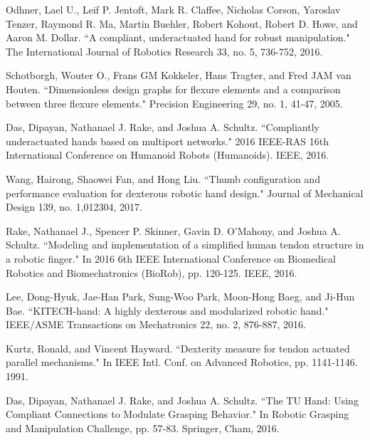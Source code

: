 \documentclass[letterpaper, 10 pt, conference]{ieeeconf}
\begin{document}
\begin{thebibliography}{99}

Odhner, Lael U., Leif P. Jentoft, Mark R. Claffee, Nicholas Corson, Yaroslav Tenzer, Raymond R. Ma, Martin Buehler, Robert Kohout, Robert D. Howe, and Aaron M. Dollar. ``A compliant, underactuated hand for robust manipulation." The International Journal of Robotics Research 33, no. 5, 736-752, 2016.

Schotborgh, Wouter O., Frans GM Kokkeler, Hans Tragter, and Fred JAM van Houten. ``Dimensionless design graphs for flexure elements and a comparison between three flexure elements." Precision Engineering 29, no. 1, 41-47, 2005.

Das, Dipayan, Nathanael J. Rake, and Joshua A. Schultz. ``Compliantly underactuated hands based on multiport networks." 2016 IEEE-RAS 16th International Conference on Humanoid Robots (Humanoids). IEEE, 2016.

Wang, Hairong, Shaowei Fan, and Hong Liu. ``Thumb configuration and performance evaluation for dexterous robotic hand design." Journal of Mechanical Design 139, no. 1,012304, 2017.

Rake, Nathanael J., Spencer P. Skinner, Gavin D. O'Mahony, and Joshua A. Schultz. ``Modeling and implementation of a simplified human tendon structure in a robotic finger." In 2016 6th IEEE International Conference on Biomedical Robotics and Biomechatronics (BioRob), pp. 120-125. IEEE, 2016.

Lee, Dong-Hyuk, Jae-Han Park, Sung-Woo Park, Moon-Hong Baeg, and Ji-Hun Bae. ``KITECH-hand: A highly dexterous and modularized robotic hand." IEEE/ASME Transactions on Mechatronics 22, no. 2, 876-887, 2016.

Kurtz, Ronald, and Vincent Hayward. ``Dexterity measure for tendon actuated parallel mechanisms." In IEEE Intl. Conf. on Advanced Robotics, pp. 1141-1146. 1991.


Das, Dipayan, Nathanael J. Rake, and Joshua A. Schultz. ``The TU Hand: Using Compliant Connections to Modulate Grasping Behavior." In Robotic Grasping and Manipulation Challenge, pp. 57-83. Springer, Cham, 2016.

\end{thebibliography}
\end{document}
